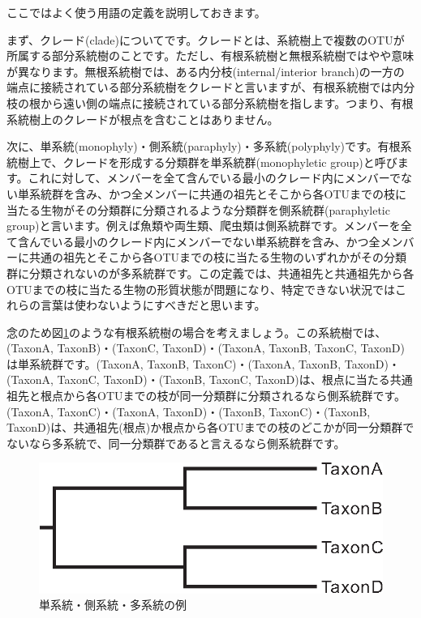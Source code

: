 \documentclass[titlepage,10pt,a4paper]{jsbook}
\begin{document}
ここではよく使う用語の定義を説明しておきます。

まず、クレード(clade)についてです。クレードとは、系統樹上で複数のOTUが所属する部分系統樹のことです。ただし、有根系統樹と無根系統樹ではやや意味が異なります。無根系統樹では、ある内分枝(internal/interior branch)の一方の端点に接続されている部分系統樹をクレードと言いますが、有根系統樹では内分枝の根から遠い側の端点に接続されている部分系統樹を指します。つまり、有根系統樹上のクレードが根点を含むことはありません。

次に、単系統(monophyly)・側系統(paraphyly)・多系統(polyphyly)です。有根系統樹上で、クレードを形成する分類群を単系統群(monophyletic group)と呼びます。これに対して、メンバーを全て含んでいる最小のクレード内にメンバーでない単系統群を含み、かつ全メンバーに共通の祖先とそこから各OTUまでの枝に当たる生物がその分類群に分類されるような分類群を側系統群(paraphyletic group)と言います。例えば魚類や両生類、爬虫類は側系統群です。メンバーを全て含んでいる最小のクレード内にメンバーでない単系統群を含み、かつ全メンバーに共通の祖先とそこから各OTUまでの枝に当たる生物のいずれかがその分類群に分類されないのが多系統群です。この定義では、共通祖先と共通祖先から各OTUまでの枝に当たる生物の形質状態が問題になり、特定できない状況ではこれらの言葉は使わないようにすべきだと思います。

念のため図\ref{figure:phyly}のような有根系統樹の場合を考えましょう。この系統樹では、(TaxonA, TaxonB)・(TaxonC, TaxonD)・(TaxonA, TaxonB, TaxonC, TaxonD)は単系統群です。(TaxonA, TaxonB, TaxonC)・(TaxonA, TaxonB, TaxonD)・(TaxonA, TaxonC, TaxonD)・(TaxonB, TaxonC, TaxonD)は、根点に当たる共通祖先と根点から各OTUまでの枝が同一分類群に分類されるなら側系統群です。(TaxonA, TaxonC)・(TaxonA, TaxonD)・(TaxonB, TaxonC)・(TaxonB, TaxonD)は、共通祖先(根点)か根点から各OTUまでの枝のどこかが同一分類群でないなら多系統で、同一分類群であると言えるなら側系統群です。
\begin{figure}[h]
\begin{center}
\caption{単系統・側系統・多系統の例}\label{figure:phyly}
\includegraphics[width=\linewidth,keepaspectratio]{phyly.eps}
\end{center}
\end{figure}
\end{document}
